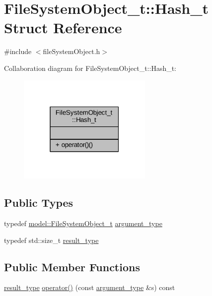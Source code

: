 \hypertarget{struct_file_system_object__t_1_1_hash__t}{}\section{File\+System\+Object\+\_\+t\+:\+:Hash\+\_\+t Struct Reference}
\label{struct_file_system_object__t_1_1_hash__t}


{\ttfamily \#include $<$file\+System\+Object.\+h$>$}



Collaboration diagram for File\+System\+Object\+\_\+t\+:\+:Hash\+\_\+t\+:
\nopagebreak
\begin{figure}[H]
\begin{center}
\leavevmode
\includegraphics[width=183pt]{struct_file_system_object__t_1_1_hash__t__coll__graph}
\end{center}
\end{figure}
\subsection*{Public Types}
\begin{DoxyCompactItemize}
\item 
typedef \hyperlink{structmodel_1_1_file_system_object__t}{model\+::\+File\+System\+Object\+\_\+t} \hyperlink{struct_file_system_object__t_1_1_hash__t_adae517eced07b62bc5a0fae1d740751a}{argument\+\_\+type}
\item 
typedef std\+::size\+\_\+t \hyperlink{struct_file_system_object__t_1_1_hash__t_ad9f4d30737281c04f63d62c8a15be2d0}{result\+\_\+type}
\end{DoxyCompactItemize}
\subsection*{Public Member Functions}
\begin{DoxyCompactItemize}
\item 
\hyperlink{struct_file_system_object__t_1_1_hash__t_ad9f4d30737281c04f63d62c8a15be2d0}{result\+\_\+type} \hyperlink{struct_file_system_object__t_1_1_hash__t_a190f95d50368a7e93a245bfdd38880f2}{operator()} (const \hyperlink{struct_file_system_object__t_1_1_hash__t_adae517eced07b62bc5a0fae1d740751a}{argument\+\_\+type} \&s) const 
\end{DoxyCompactItemize}


